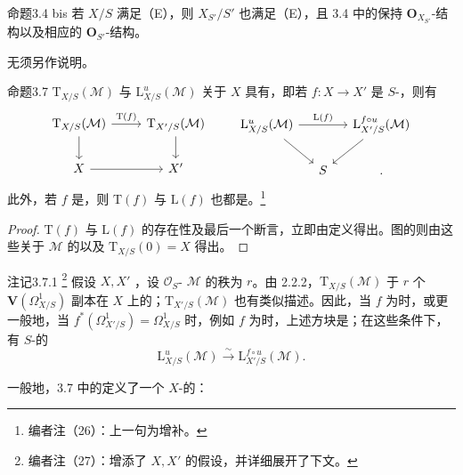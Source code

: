 \begin{SGAresult}{命题}{3.4 bis}
若 $X/S$ 满足（E），则 $X_{S'}/S'$ 也满足（E），且 3.4 中的保持 $\mathbf O_{X_{S'}}$-结构以及相应的 $\mathbf O_{S'}$-结构。
\end{SGAresult}
无须另作说明。
\begin{SGAresult}{命题}{3.7}
 $\mathrm T_{X/S}(\mathcal M)$ 与 $\mathrm L^u_{X/S}(\mathcal M)$ 关于 $X$ 具有，即若 $f:X\to X'$ 是 $S$-，则有
\[
\begin{tikzcd}
\mathrm T_{X/S}(\mathcal M)\arrow[r,"\mathrm T(f)"]\arrow[d]&\mathrm T_{X'/S}(\mathcal M)\arrow[d]\\
X\arrow[r]&X'
\end{tikzcd}
\qquad
\begin{tikzcd}[column sep=small]
\mathrm L^u_{X/S}(\mathcal M)\arrow[rr,"\mathrm L(f)"]\arrow[dr]&&\mathrm L^{f\circ u}_{X'/S}(\mathcal M)\arrow[dl]\\
&S&.
\end{tikzcd}
\]
此外，若 $f$ 是，则 $\mathrm T(f)$ 与 $\mathrm L(f)$ 也都是。\footnote{编者注（26）：上一句为增补。}
\end{SGAresult}
\begin{proof}
$\mathrm T(f)$ 与 $\mathrm L(f)$ 的存在性及最后一个断言，立即由定义得出。图的则由这些关于 $\mathcal M$ 的以及 $\mathrm T_{X/S}(0)=X$ 得出。
\end{proof}
\begin{SGAresult}{注记}{3.7.1}
\footnote{编者注（27）：增添了 $X,X'$ 的假设，并详细展开了下文。} 假设 $X,X'$ ，设 $\mathcal O_S$- $\mathcal M$ 的秩为 $r$。由 2.2.2，$\mathrm T_{X/S}(\mathcal M)$ 于 $r$ 个 $\mathbf V(\Omega^1_{X/S})$ 副本在 $X$ 上的；$\mathrm T_{X'/S}(\mathcal M)$ 也有类似描述。因此，当 $f$ 为时，或更一般地，当 $f^*(\Omega^1_{X'/S})=\Omega^1_{X/S}$ 时，例如 $f$ 为时，上述方块是；在这些条件下，有 $S$-的
\[
\mathrm L^u_{X/S}(\mathcal M)\xrightarrow\sim\mathrm L^{f\circ u}_{X'/S}(\mathcal M).
\]
\end{SGAresult}
一般地，3.7 中的定义了一个 $X$-的：
